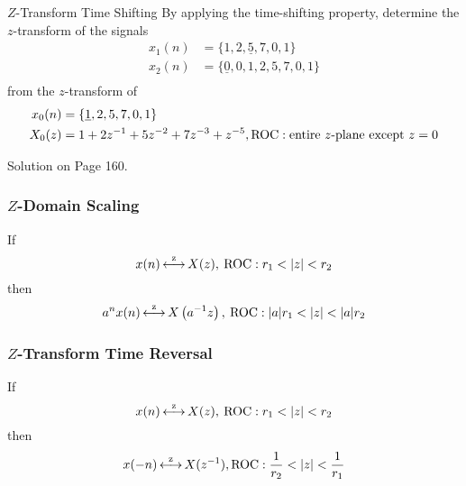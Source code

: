 \begin{example}[Example 3.2.3]{\texorpdfstring{$Z$-Transform}{Z-Transform} Time Shifting}
  By applying the time-shifting property, determine the $z$-transform of the signals
  \begin{equation*}
    \begin{aligned}
      x_{1}(n) &= \lbrace 1, 2, \underline{5}, 7, 0, 1 \rbrace \\
      x_{2}(n) &= \lbrace \underline{0}, 0, 1, 2, 5, 7, 0, 1 \rbrace \\
    \end{aligned}
  \end{equation*}
  from the $z$-transform of
  \begin{equation*}
    \begin{aligned}
      x_{0}(n) &= \lbrace \underline{1}, 2, 5, 7, 0, 1 \rbrace \\
        X_{0}(z) &= 1 + 2z^{-1} + 5z^{-2} + 7z^{-3} + z^{-5}, \operatorname{\mathrm{ROC}}: \text{entire $z$-plane except } z=0 \\
      \end{aligned}
    \end{equation*}

    \tcblower

    Solution on Page 160.
\end{example}

\subsubsection{\texorpdfstring{$Z$-Domain}{Z-Domain} Scaling}\label{subsubsec:Z-Domain Scaling}
If
\begin{equation*}
  x(n) \operatorname{\overset{z}{\longleftrightarrow}} X(z), \> \operatorname{\mathrm{ROC}}: r_{1}< \lvert z \rvert < r_{2}
\end{equation*}
then
\begin{equation}\label{eq:Z-Domain Scaling}
  a^{n}x(n) \operatorname{\overset{z}{\longleftrightarrow}} X \left( a^{-1}z \right), \> \operatorname{\mathrm{ROC}}: \lvert a \rvert r_{1} < \lvert z \rvert < \lvert a \rvert r_{2}
\end{equation}

\subsubsection{\texorpdfstring{$Z$-Transform}{Z-Transform} Time Reversal}\label{subsubsec:Z-Transform Time Reversal}
If
\begin{equation*}
  x(n) \operatorname{\overset{z}{\longleftrightarrow}} X(z), \> \operatorname{\mathrm{ROC}}: r_{1}< \lvert z \rvert < r_{2}
\end{equation*}
then
\begin{equation}\label{eq:Z-Transform Time Reversal}
  x(-n) \operatorname{\overset{z}{\longleftrightarrow}} X(z^{-1}), \operatorname{\mathrm{ROC}}: \frac{1}{r_{2}} < \lvert z \rvert < \frac{1}{r_{1}}
\end{equation}

